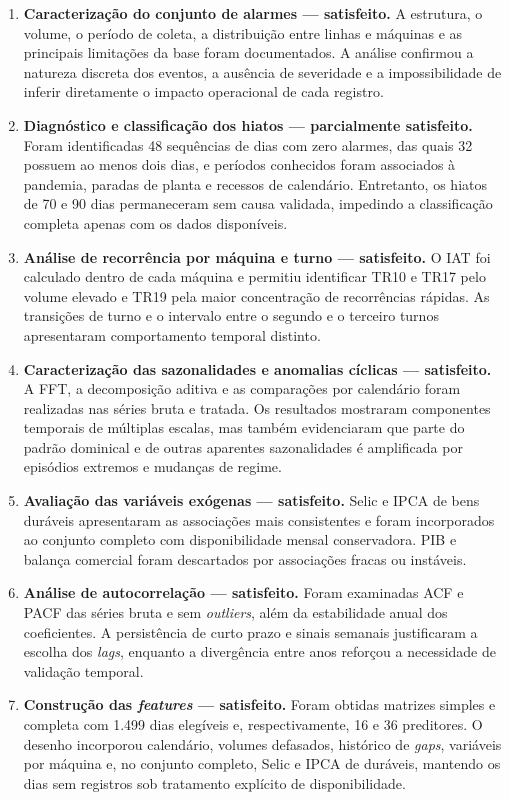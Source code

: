 \begin{enumerate}
    \item \textbf{Caracterização do conjunto de alarmes --- satisfeito.} A estrutura, o volume, o período de coleta, a distribuição entre linhas e máquinas e as principais limitações da base foram documentados. A análise confirmou a natureza discreta dos eventos, a ausência de severidade e a impossibilidade de inferir diretamente o impacto operacional de cada registro.
    \item \textbf{Diagnóstico e classificação dos hiatos --- parcialmente satisfeito.} Foram identificadas 48 sequências de dias com zero alarmes, das quais 32 possuem ao menos dois dias, e períodos conhecidos foram associados à pandemia, paradas de planta e recessos de calendário. Entretanto, os hiatos de 70 e 90 dias permaneceram sem causa validada, impedindo a classificação completa apenas com os dados disponíveis.
    \item \textbf{Análise de recorrência por máquina e turno --- satisfeito.} O IAT foi calculado dentro de cada máquina e permitiu identificar TR10 e TR17 pelo volume elevado e TR19 pela maior concentração de recorrências rápidas. As transições de turno e o intervalo entre o segundo e o terceiro turnos apresentaram comportamento temporal distinto.
    \item \textbf{Caracterização das sazonalidades e anomalias cíclicas --- satisfeito.} A FFT, a decomposição aditiva e as comparações por calendário foram realizadas nas séries bruta e tratada. Os resultados mostraram componentes temporais de múltiplas escalas, mas também evidenciaram que parte do padrão dominical e de outras aparentes sazonalidades é amplificada por episódios extremos e mudanças de regime.
    \item \textbf{Avaliação das variáveis exógenas --- satisfeito.} Selic e IPCA de bens duráveis apresentaram as associações mais consistentes e foram incorporados ao conjunto completo com disponibilidade mensal conservadora. PIB e balança comercial foram descartados por associações fracas ou instáveis.
    \item \textbf{Análise de autocorrelação --- satisfeito.} Foram examinadas ACF e PACF das séries bruta e sem \textit{outliers}, além da estabilidade anual dos coeficientes. A persistência de curto prazo e sinais semanais justificaram a escolha dos \textit{lags}, enquanto a divergência entre anos reforçou a necessidade de validação temporal.
    \item \textbf{Construção das \textit{features} --- satisfeito.} Foram obtidas matrizes simples e completa com 1.499 dias elegíveis e, respectivamente, 16 e 36 preditores. O desenho incorporou calendário, volumes defasados, histórico de \textit{gaps}, variáveis por máquina e, no conjunto completo, Selic e IPCA de duráveis, mantendo os dias sem registros sob tratamento explícito de disponibilidade.

\end{enumerate}
